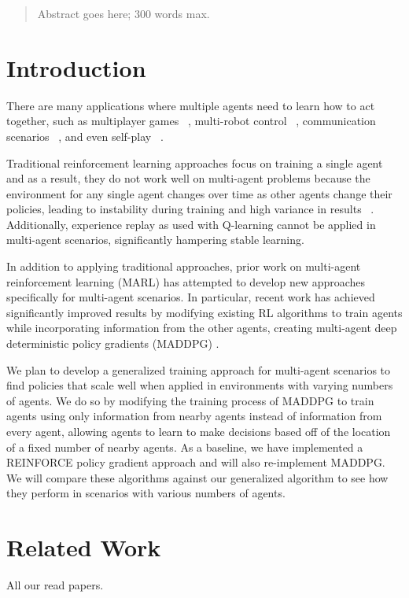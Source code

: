 \documentclass{article}
\begin{document}
\begin{abstract}
Abstract goes here; 300 words max.
\end{abstract}


\section{Introduction}
\label{submission}

There are many applications where multiple agents need to learn how to act together, such as multiplayer games ~\cite{multigames}, multi-robot control ~\cite{multirobot}, communication scenarios ~\cite{communication}, and even self-play ~\cite{selfplay}.

Traditional reinforcement learning approaches focus on training a single agent and as a result, they do not work well on multi-agent problems because the environment for any single agent changes over time as other agents change their policies, leading to instability during training and high variance in results ~\cite{unstable}. Additionally, experience replay as used with Q-learning cannot be applied in multi-agent scenarios, significantly hampering stable learning.

In addition to applying traditional approaches, prior work on multi-agent reinforcement learning (MARL) has attempted to develop new approaches specifically for multi-agent scenarios. In particular, recent work has achieved significantly improved results by modifying existing RL algorithms to train agents while incorporating information from the other agents, creating multi-agent deep deterministic policy gradients (MADDPG) \cite{maddpg}.

We plan to develop a generalized training approach for multi-agent scenarios to find policies that scale well when applied in environments with varying numbers of agents. We do so by modifying the training process of MADDPG to train agents using only information from nearby agents instead of information from every agent, allowing agents to learn to make decisions based off of the location of a fixed number of nearby agents. As a baseline, we have implemented a REINFORCE policy gradient approach and will also re-implement MADDPG. We will compare these algorithms against our generalized algorithm to see how they perform in scenarios with various numbers of agents.

\section{Related Work}
All our read papers.
\end{document}

